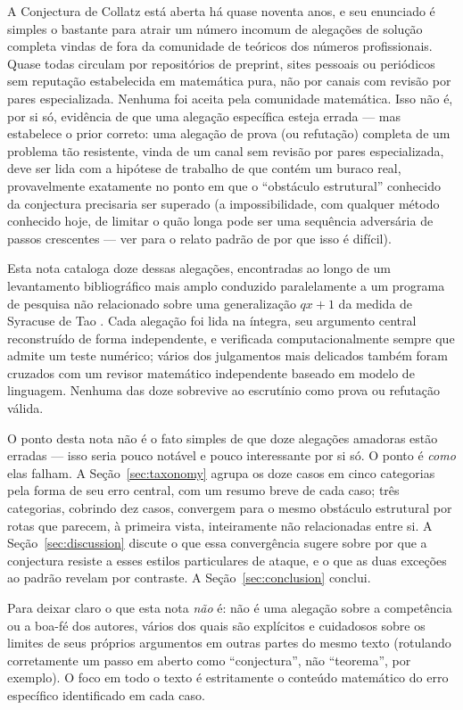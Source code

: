 \documentclass[11pt]{article}
\begin{document}
A Conjectura de Collatz está aberta há quase noventa anos, e seu
enunciado é simples o bastante para atrair um número incomum de
alegações de solução completa vindas de fora da comunidade de teóricos
dos números profissionais. Quase todas circulam por repositórios de
preprint, sites pessoais ou periódicos sem reputação estabelecida em
matemática pura, não por canais com revisão por pares especializada.
Nenhuma foi aceita pela comunidade matemática. Isso não é, por si só,
evidência de que uma alegação específica esteja errada --- mas
estabelece o prior correto: uma alegação de prova (ou refutação)
completa de um problema tão resistente, vinda de um canal sem revisão
por pares especializada, deve ser lida com a hipótese de trabalho de
que contém um buraco real, provavelmente exatamente no ponto em que o
``obstáculo estrutural'' conhecido da conjectura precisaria ser
superado (a impossibilidade, com qualquer método conhecido hoje, de
limitar o quão longa pode ser uma sequência adversária de passos
crescentes --- ver \cite{LagariasSurvey} para o relato padrão de por
que isso é difícil).

Esta nota cataloga doze dessas alegações, encontradas ao longo de um
levantamento bibliográfico mais amplo conduzido paralelamente a um
programa de pesquisa não relacionado sobre uma generalização $qx+1$ da
medida de Syracuse de Tao \cite{Tao2022}. Cada alegação foi lida na
íntegra, seu argumento central reconstruído de forma independente, e
verificada computacionalmente sempre que admite um teste numérico;
vários dos julgamentos mais delicados também foram cruzados com um
revisor matemático independente baseado em modelo de linguagem. Nenhuma
das doze sobrevive ao escrutínio como prova ou refutação válida.

O ponto desta nota não é o fato simples de que doze alegações amadoras
estão erradas --- isso seria pouco notável e pouco interessante por si
só. O ponto é \emph{como} elas falham. A Seção~\ref{sec:taxonomy} agrupa
os doze casos em cinco categorias pela forma de seu erro central, com
um resumo breve de cada caso; três categorias, cobrindo dez casos,
convergem para o mesmo obstáculo estrutural por rotas que parecem, à
primeira vista, inteiramente não relacionadas entre si. A
Seção~\ref{sec:discussion} discute o que essa convergência sugere sobre
por que a conjectura resiste a esses estilos particulares de ataque, e
o que as duas exceções ao padrão revelam por contraste. A
Seção~\ref{sec:conclusion} conclui.

Para deixar claro o que esta nota \emph{não} é: não é uma alegação
sobre a competência ou a boa-fé dos autores, vários dos quais são
explícitos e cuidadosos sobre os limites de seus próprios argumentos em
outras partes do mesmo texto (rotulando corretamente um passo em aberto
como ``conjectura'', não ``teorema'', por exemplo). O foco em todo o
texto é estritamente o conteúdo matemático do erro específico
identificado em cada caso.
\end{document}
